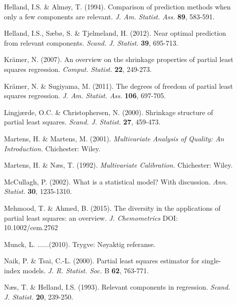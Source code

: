 \documentclass[11pt]{article}
\begin{document}
\begin{description}
\item[] Helland, I.S. \& Alm\o y, T. (1994). Comparison of prediction methods when only a few components are relevant. \textit{J. Am. Statist. Ass.} \textbf{89}, 583-591.
 
\item[] Helland, I.S., S\ae b\o , S. \& Tjelmeland, H. (2012). Near optimal prediction from relevant components. \textit{Scand. J. Statist.} \textbf{39}, 
695-713.

\item[] Kr\"{a}mer, N. (2007). An overview on the shrinkage properties of partial least squares regression. \textit{Comput. Statist.} \textbf{22}, 249-273.

\item[] Kr\"{a}mer, N. \& Sugiyama, M. (2011). The degrees of freedom of partial least squares regression. \textit{J. Am. Statist. Ass.} \textbf{106}, 697-705.

\item[] Lingj\ae rde, O.C. \& Christophersen, N. (2000). Shrinkage structure of partial least squares. \textit{Scand. J. Statist.} \textbf{27}, 459-473.

\item[] Martens, H. \& Martens, M. (2001). \textit{Multivariate Analysis of Quality: An Introduction.} Chichester: Wiley.

\item[] Martens, H. \& N\ae s, T. (1992). \textit{Multivariate Calibration.} Chichester: Wiley.

\item[] McCullagh, P. (2002). What is a statistical model? With discussion. \textit{Ann. Statist.} \textbf{30}, 1235-1310.

\item[] Mehmood, T. \& Ahmed, B. (2015). The diversity in the applications of partial least squares: an overview. \textit{J. Chemometrics} DOI: 10.1002/cem.2762

\item[] Munck, L. ......(2010). Trygve: N\o yaktig referanse.

\item[] Naik, P. \& Tsai, C.-L. (2000). Partial least squares estimator for single-index models. \textit{J. R. Statist. Soc.} B \textbf{62}, 763-771.

\item[] N\ae s, T. \& Helland, I.S. (1993). Relevant components in regression. \textit{Scand. J. Statist.} \textbf{20}, 239-250.


\end{description}
\end{document}
